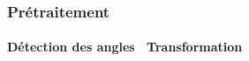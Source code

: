         \begin{frame}
            \frametitle{Prétraitement}
            \framesubtitle{Détection des angles \ Transformation}
            \begin{columns}
                \begin{column}{.3\linewidth}
                \end{column}
                \pause
                \begin{column}{.3\linewidth}

\end{column}
\end{columns}
\end{frame}
